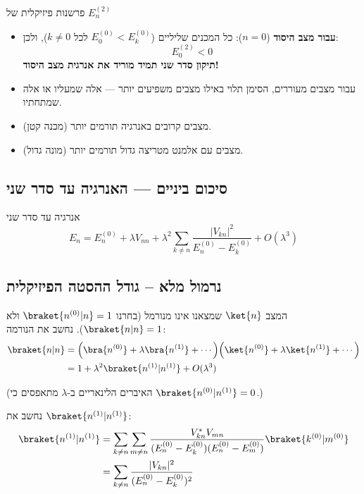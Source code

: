\begin{theorembox}{פרשנות פיזיקלית של $E_n^{(2)}$}
\begin{itemize}
\item \textbf{עבור מצב היסוד} ($n=0$): כל המכנים שליליים ($E_0^{(0)} < E_k^{(0)}$ לכל $k \neq 0$), ולכן:
\[
E_0^{(2)} < 0
\]
\textbf{תיקון סדר שני תמיד מוריד את אנרגית מצב היסוד!}

\item עבור מצבים מעוררים, הסימן תלוי באילו מצבים משפיעים יותר — אלה שמעליו או אלה שמתחתיו.

\item מצבים קרובים באנרגיה תורמים יותר (מכנה קטן).

\item מצבים עם אלמנט מטריצה גדול תורמים יותר (מונה גדול).
\end{itemize}
\end{theorembox}

\subsection{סיכום ביניים — האנרגיה עד סדר שני}

\begin{resultbox}{אנרגיה עד סדר שני}
\[
\boxed{E_n = E_n^{(0)} + \lambda V_{nn} + \lambda^2 \sum_{k\neq n}\frac{|V_{kn}|^2}{E_n^{(0)}-E_k^{(0)}} + O(\lambda^3)}
\]
\end{resultbox}

\subsection{נרמול מלא – גודל ההסטה הפיזיקלית}

המצב $\ket{n}$ שמצאנו אינו מנורמל (בחרנו $\braket{n^{(0)}|n}=1$ ולא $\braket{n|n}=1$). נחשב את הנורמה:
\begin{align}
\braket{n|n} &= \Big(\bra{n^{(0)}} + \lambda\bra{n^{(1)}} + \cdots\Big)\Big(\ket{n^{(0)}} + \lambda\ket{n^{(1)}} + \cdots\Big) \\
&= 1 + \lambda^2\braket{n^{(1)}|n^{(1)}} + O(\lambda^3)
\end{align}

(האיברים הלינאריים ב-$\lambda$ מתאפסים כי $\braket{n^{(0)}|n^{(1)}}=0$.)

נחשב את $\braket{n^{(1)}|n^{(1)}}$:
\begin{align}
\braket{n^{(1)}|n^{(1)}} &= \sum_{k\neq n}\sum_{m\neq n}\frac{V_{kn}^*V_{mn}}{(E_n^{(0)}-E_k^{(0)})(E_n^{(0)}-E_m^{(0)})}\braket{k^{(0)}|m^{(0)}} \\
&= \sum_{k\neq n}\frac{|V_{kn}|^2}{(E_n^{(0)}-E_k^{(0)})^2}
\end{align}

